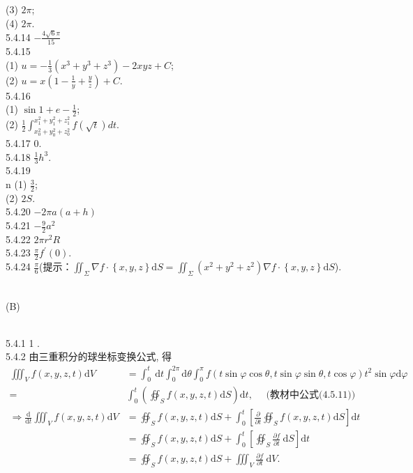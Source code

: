 \documentclass[a4paper,11pt,UTF8]{article}
\begin{document}
(3) $2 \pi$;\\
(4) $2 \pi$.\\
5.4.14 $-\frac{4 \sqrt{6} \pi}{15}$\\
5.4.15\\
(1) $u=-\frac{1}{3}\left(x^3+y^3+z^3\right)-2 x y z+C$;\\
(2) $u=x\left(1-\frac{1}{y}+\frac{y}{z}\right)+C$.\\
5.4.16\\
(1) $\sin 1+e-\frac{1}{2}$;\\
(2) $\frac{1}{2} \int_{x_0^2+y_0^2+z_0^2}^{x_1^2+y_1^2+z_1^2} f(\sqrt{t}) d t$.\\
5.4.17 0.\\
5.4.18 $\frac{1}{3} h^3$.\\
5.4.19\\n
(1) $\frac{3}{2}$;\\
(2) $2 S$.\\
5.4.20 $-2\pi a(a+h)$\\
5.4.21 $-\frac{9}{2} a^2$\\
5.4.22 $2\pi r^2 R $\\
5.4.23 $\frac{\pi}{2} f^{\prime}(0)$.\\
5.4.24 $\frac{\pi}{6}$(提示：$\iint_\Sigma\nabla f \cdot \left\{x, y ,z\right\}\mathrm{d}S=\iint_\Sigma(x^2+y^2+z^2)\nabla f \cdot \left\{x, y ,z\right\}\mathrm{d}S$).\\\\
\centerline{(B)}\\
5.4.1 1 .\\
5.4.2 由三重积分的球坐标变换公式, 得\\
$$
\begin{aligned}
	\iiint_V f(x, y, z, t) \mathrm{d} V & =\int_0^t \mathrm{~d} t \int_0^{2 \pi} \mathrm{d} \theta \int_0^\pi f(t \sin \varphi \cos \theta, t \sin \varphi \sin \theta, t \cos \varphi) t^2 \sin \varphi \mathrm{d} \varphi \\
	= & \int_0^t\left(\oiint_S f(x, y, z, t) \mathrm{d} S\right) \mathrm{d} t, \quad \text { (教材中公式(4.5.11)) } \\
	\Rightarrow \frac{\mathrm{d}}{\mathrm{d} t} \iiint_V f(x, y, z, t) \mathrm{d} V & =\oiint_S f(x, y, z, t) \mathrm{d} S+\int_0^t\left[\frac{\partial}{\partial t} \oiint_S f(x, y, z, t) \mathrm{d} S\right] \mathrm{d} t \\
	& =\oiint_S f(x, y, z, t) \mathrm{d} S+\int_0^t\left[\oiint_S \frac{\partial f}{\partial t} \mathrm{~d} S\right] \mathrm{d} t \\
	& =\oiint_S f(x, y, z, t) \mathrm{d} S+\iiint_V \frac{\partial f}{\partial t} \mathrm{~d} V .
\end{aligned}
$$\\
\end{document}
